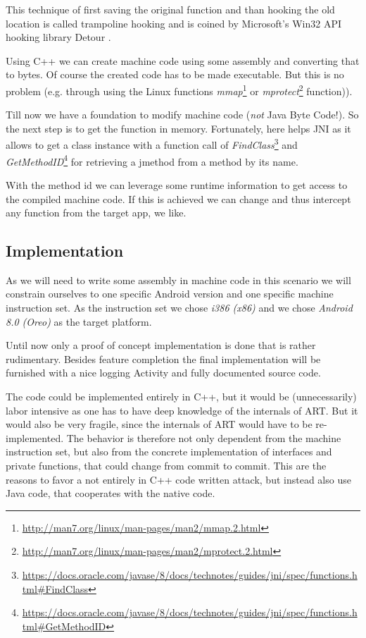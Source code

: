 This technique of first saving the original function and than hooking the old location is called trampoline hooking and is coined by Microsoft's Win32 API hooking library Detour \cite{detours-binary-interception-of-win32-functions}.

Using C++ we can create machine code using some assembly and converting that to bytes.
Of course the created code has to be made executable. But this is no problem (e.g. through using the Linux functions \emph{mmap}\footnote{\url{http://man7.org/linux/man-pages/man2/mmap.2.html}} or \emph{mprotect}\footnote{\url{http://man7.org/linux/man-pages/man2/mprotect.2.html}} function)).

Till now we have a foundation to modify machine code (\emph{not} Java Byte Code!). So the next step is to get the function in memory. Fortunately, here helps JNI as it allows to get a class instance with a function call of  \emph{FindClass}\footnote{\url{https://docs.oracle.com/javase/8/docs/technotes/guides/jni/spec/functions.html\#FindClass}} and \emph{GetMethodID}\footnote{\url{https://docs.oracle.com/javase/8/docs/technotes/guides/jni/spec/functions.html\#GetMethodID}} for retrieving a jmethod from a method by its name.

With the method id we can leverage some runtime information to get access to the compiled machine code. If this is achieved we can change and thus intercept any function from the target app, we like.


\subsection{Implementation}

As we will need to write some assembly in machine code in this scenario we will 
constrain ourselves to one specific Android version and one specific machine instruction set. As the instruction set we  chose \emph{i386 (x86)} and 
we chose \emph{Android 8.0 (Oreo)} as the target platform.

Until now only a proof of concept implementation is done that is rather rudimentary. 
Besides feature completion the final implementation will be furnished with a nice logging Activity and fully documented source code. 

The code could be implemented entirely in C++, but it would be (unnecessarily) labor intensive as one has to have deep knowledge of the internals of ART. But it would also be very fragile, since the internals of ART would have to be re-implemented. The behavior is therefore not only dependent from  the machine instruction set, but also from the concrete implementation of interfaces and private functions, that could change from commit to commit.
This are the reasons to favor a not entirely in C++ code written attack, but instead also use Java code, that cooperates with the native code.

